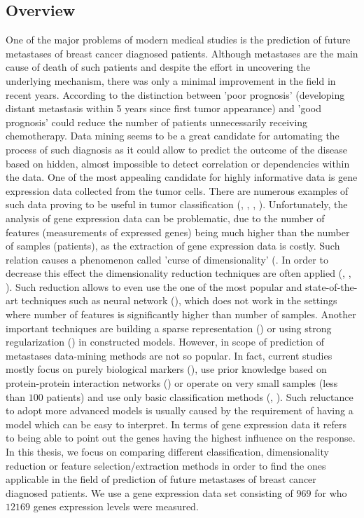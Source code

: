 \documentclass[12pt, wide]{mwart}
\begin{document}
\subsection{Overview}
One of the major problems of modern medical studies is the prediction of future metastases of breast cancer diagnosed patients. Although metastases are the main cause of death of such patients and despite the effort in uncovering the underlying mechanism, there was only a minimal improvement in the field in recent years. According to \cite{Metastasis1} the distinction between 'poor prognosis' (developing distant metastasis within 5 years since first tumor appearance) and 'good prognosis' could reduce the number of patients unnecessarily receiving chemotherapy. Data mining seems to be a great candidate for automating the process of such diagnosis as it could allow to predict the outcome of the disease based on hidden, almost impossible to detect correlation or dependencies within the data. One of the most appealing candidate for highly informative data is gene expression data collected from the tumor cells. There are numerous examples of such data proving to be useful in tumor classification (\cite{BreastCancerClassification}, \cite{TumorMolecularClass}, \cite{TumorsClass1}, \cite{TumorClass2}). Unfortunately, the analysis of gene expression data can be problematic, due to the number of features (measurements of expressed genes) being much higher than the number of samples (patients), as the extraction of gene expression data is costly. Such relation causes a phenomenon called 'curse of dimensionality' (\cite[p. 22-26]{ESL2}. In order to decrease this effect the dimensionality reduction techniques are often applied (\cite{MasterArts}, \cite{TumorClass4}, \cite{TumorPLS}). Such reduction allows to even use the one of the most popular and state-of-the-art techniques such as neural network (\cite{fDNN}), which does not work in the settings where number of features is significantly higher than number of samples. Another important techniques are building a sparse representation (\cite{TumorClass3}) or using strong regularization (\cite[p. 649-666]{ESL2}) in constructed models. However, in scope of prediction of metastases data-mining methods are not so popular. In fact, current studies mostly focus on purely biological markers (\cite{Metastasis4}), use prior knowledge based on protein-protein interaction networks (\cite{MetastasisScores}) or operate on very small samples (less than $100$ patients) and use only basic classification methods (\cite{Metastasis1}, \cite{Metastasis2}). Such reluctance to adopt more advanced models is usually caused by the requirement of having a model which can be easy to interpret. In terms of gene expression data it refers to being able to point out the genes having the highest influence on the response. In this thesis, we focus on comparing different classification, dimensionality reduction or feature selection/extraction methods in order to find the ones applicable in the field of prediction of future metastases of breast cancer diagnosed patients. We use a gene expression data set consisting of $969$ for who $12169$ genes expression levels were measured.
\end{document}
